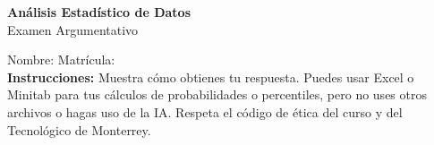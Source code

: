\documentclass[11pt]{article}
\newcommand{\exinput}[1]{}
\begin{document}
\begin{center}
\large \textbf{An\'alisis Estad\'istico de Datos} \\
\large Examen Argumentativo
\end{center}

Nombre: \underline{\hspace*{3in}} \quad Matr\'icula:\underline{\hspace*{2in}} \\

\noindent \textbf{Instrucciones:} Muestra c\'omo obtienes tu respuesta. Puedes usar Excel 
o Minitab para tus cálculos de probabilidades o 
percentiles, pero no uses otros archivos o hagas uso de la IA. Respeta el 
c\'odigo de \'etica del curso y del Tecnol\'ogico 
de Monterrey.

\begin{enumerate}
    \exinput{exercises}
\end{enumerate}
\end{document}
